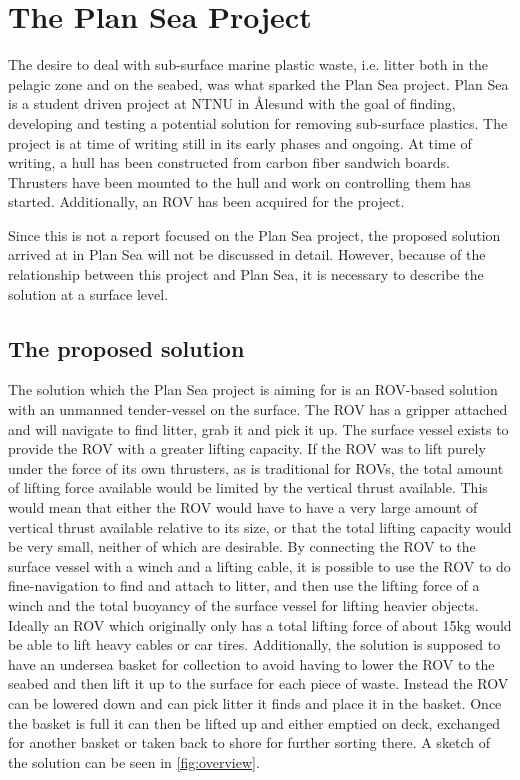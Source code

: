 \section{The Plan Sea Project}
The desire to deal with sub-surface marine plastic waste, i.e. litter both in the pelagic zone and on the seabed, was what sparked the Plan Sea project. Plan Sea is a student driven project at NTNU in Ålesund with the goal of finding, developing and testing a potential solution for removing sub-surface plastics. The project is at time of writing still in its early phases and ongoing. At time of writing, a hull has been constructed from carbon fiber sandwich boards. Thrusters have been mounted to the hull and work on controlling them has started. Additionally, an ROV has been acquired for the project. 

Since this is not a report focused on the Plan Sea project, the proposed solution arrived at in Plan Sea will not be discussed in detail. However, because of the relationship between this project and Plan Sea, it is necessary to describe the solution at a surface level. 

\subsection{The proposed solution}
The solution which the Plan Sea project is aiming for is an ROV-based solution with an unmanned tender-vessel on the surface. The ROV has a gripper attached and will navigate to find litter, grab it and pick it up. The surface vessel exists to provide the ROV with a greater lifting capacity. If the ROV was to lift purely under the force of its own thrusters, as is traditional for ROVs, the total amount of lifting force available would be limited by the vertical thrust available. This would mean that either the ROV would have to have a very large amount of vertical thrust available relative to its size, or that the total lifting capacity would be very small, neither of which are desirable. By connecting the ROV to the surface vessel with a winch and a lifting cable, it is possible to use the ROV to do fine-navigation to find and attach to litter, and then use the lifting force of a winch and the total buoyancy of the surface vessel for lifting heavier objects. Ideally an ROV which originally only has a total lifting force of about 15kg would be able to lift heavy cables or car tires. Additionally, the solution is supposed to have an undersea basket for collection to avoid having to lower the ROV to the seabed and then lift it up to the surface for each piece of waste. Instead the ROV can be lowered down and can pick litter it finds and place it in the basket. Once the basket is full it can then be lifted up and either emptied on deck, exchanged for another basket or taken back to shore for further sorting there. A sketch of the solution can be seen in \cref{fig:overview}.


